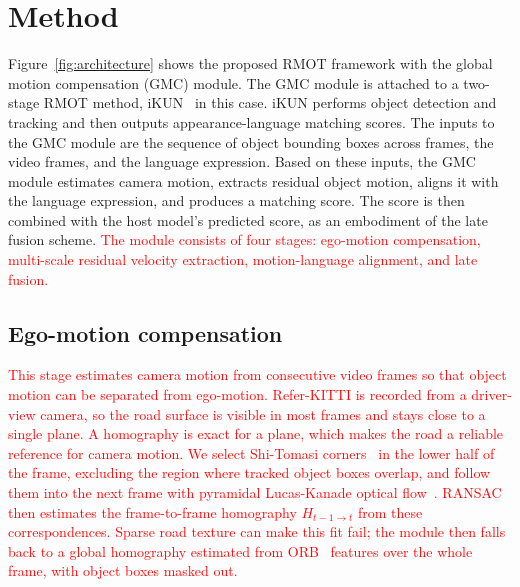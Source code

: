 \documentclass{article}
\begin{document}



\section{Method}
\label{sec:method}
Figure~\ref{fig:architecture} shows the proposed RMOT framework with the global motion compensation (GMC) module. The GMC module is attached to a two-stage RMOT method, iKUN~\cite{ikun} in this case. iKUN performs object detection and tracking and then outputs appearance-language matching scores. The inputs to the GMC module are the sequence of object bounding boxes across frames, the video frames, and the language expression. Based on these inputs, the GMC module estimates camera motion, extracts residual object motion, aligns it with the language expression, and produces a matching score. The score is then combined with the host model's predicted score, as an embodiment of the late fusion scheme. \textcolor{red}{The module consists of four stages: ego-motion compensation, multi-scale residual velocity extraction, motion-language alignment, and late fusion.}


\subsection{Ego-motion compensation}
\label{sec:ego}
\textcolor{red}{This stage estimates camera motion from consecutive video frames so that object motion can be separated from ego-motion. Refer-KITTI is recorded from a driver-view camera, so the road surface is visible in most frames and stays close to a single plane. A homography is exact for a plane, which makes the road a reliable reference for camera motion. We select Shi-Tomasi corners~\cite{shitomasi} in the lower half of the frame, excluding the region where tracked object boxes overlap, and follow them into the next frame with pyramidal Lucas-Kanade optical flow~\cite{lucaskanade}. RANSAC~\cite{ransac} then estimates the frame-to-frame homography $H_{t-1 \to t}$ from these correspondences. Sparse road texture can make this fit fail; the module then falls back to a global homography estimated from ORB~\cite{orb} features over the whole frame, with object boxes masked out.}
\end{document}
